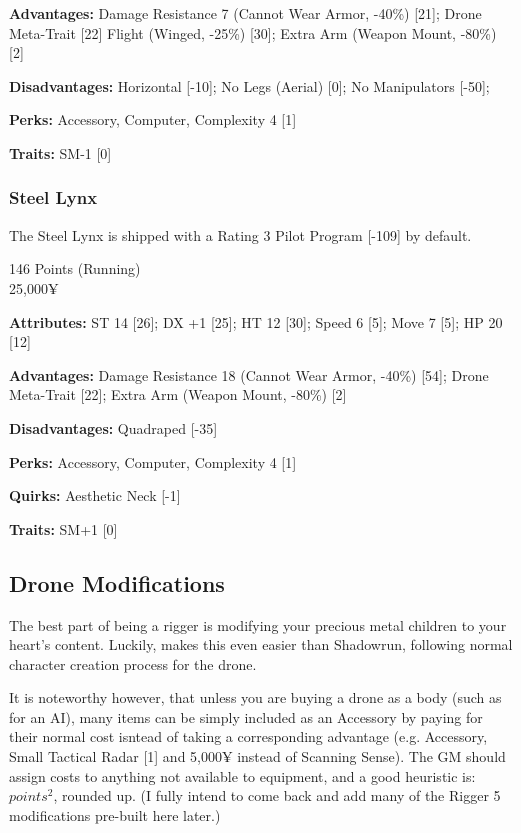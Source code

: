 \begin{multicols*}{2}
	\textbf{Advantages:} 
	Damage Resistance 7 (Cannot Wear Armor, -40\%) [21]; Drone Meta-Trait [22] Flight (Winged, -25\%) [30]; Extra Arm (Weapon Mount, -80\%) [2]
	
	\textbf{Disadvantages:} 
	Horizontal [-10]; No Legs (Aerial) [0]; No Manipulators [-50]; 
	
	\textbf{Perks:}
	Accessory, Computer, Complexity 4 [1]
	
	\textbf{Traits:}
	SM-1 [0]
	
	\subsubsection{Steel Lynx}
	
	The Steel Lynx is shipped with a Rating 3 Pilot Program [-109] by default.
	
	\begin{flushright}
		146 Points (Running)\\
		25,000¥
	\end{flushright}
	
	\textbf{Attributes:} 
	ST 14 [26]; DX +1 [25]; HT 12 [30]; 
	Speed 6 [5]; Move 7 [5]; HP 20 [12]
	
	\textbf{Advantages:} 
	Damage Resistance 18 (Cannot Wear Armor, -40\%) [54]; Drone Meta-Trait [22]; Extra Arm (Weapon Mount, -80\%) [2]
	
	\textbf{Disadvantages:} 
	Quadraped [-35]
	
	\textbf{Perks:}
	Accessory, Computer, Complexity 4 [1]
	
	\textbf{Quirks:}
	Aesthetic Neck [-1]
	
	\textbf{Traits:}
	SM+1 [0]
	
	\subsection{Drone Modifications}
	
	The best part of being a rigger is modifying your precious metal children to your heart's content. Luckily, \GURPS makes this even easier than Shadowrun, following normal character creation process for the drone. 
	
	It is noteworthy however, that unless you are buying a drone as a body (such as for an AI), many items can be simply included as an Accessory by paying for their normal cost isntead of taking a corresponding advantage (e.g. Accessory, Small Tactical Radar [1] and 5,000¥ instead of Scanning Sense). The GM should assign costs to anything not available to equipment, and a good heuristic is: $points^{2}$, rounded up. (I fully intend to come back and add many of the Rigger 5 modifications pre-built here later.)
	
\end{multicols*}

